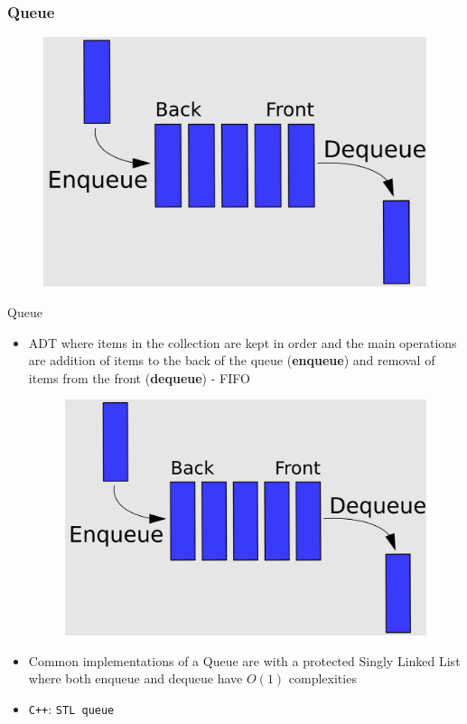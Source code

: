 \documentclass{beamer}
\begin{document}
\begin{frame}
\frametitle{Queue}
	\begin{figure}
		\centering
		\includegraphics[scale=0.2]{imgs/2-LDS/queue/queue.png}
	\end{figure}
\end{frame}

\begin{frame}[fragile]{Queue}
    \begin{itemize}
    	\item ADT where items in the collection are kept in order and the main operations are addition of items to the back of the queue (\textbf{enqueue}) and removal of items from the front (\textbf{dequeue}) - FIFO
		\begin{figure}
			\centering
			\includegraphics[scale=0.1]{imgs/2-LDS/queue/queue.png}
		\end{figure}
        \item Common implementations of a Queue are with a protected Singly Linked List where both enqueue and dequeue have $O(1)$ complexities
        \item \verb|C++|: \verb|STL queue|
    \end{itemize}
\end{frame}
\end{document}
